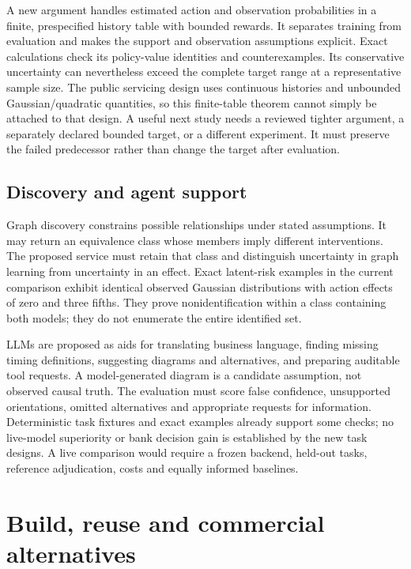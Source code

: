 A new argument handles estimated action and observation probabilities in
a finite, prespecified history table with bounded rewards. It separates
training from evaluation and makes the support and observation
assumptions explicit. Exact calculations check its policy-value
identities and counterexamples. Its conservative uncertainty can
nevertheless exceed the complete target range at a representative sample
size. The public servicing design uses continuous histories and
unbounded Gaussian/quadratic quantities, so this finite-table theorem
cannot simply be attached to that design. A useful next study needs a
reviewed tighter argument, a separately declared bounded target, or a
different experiment. It must preserve the failed predecessor rather
than change the target after evaluation.
\citep{sp13_servicing_successor}

\hypertarget{discovery-and-agent-support}{%
\subsection{Discovery and agent
support}\label{discovery-and-agent-support}}

Graph discovery constrains possible relationships under stated
assumptions. It may return an equivalence class whose members imply
different interventions. The proposed service must retain that class and
distinguish uncertainty in graph learning from uncertainty in an effect.
Exact latent-risk examples in the current comparison exhibit identical
observed Gaussian distributions with action effects of zero and three
fifths. They prove nonidentification within a class containing both
models; they do not enumerate the entire identified set.
\citep{exec13_latent_examples}

LLMs are proposed as aids for translating business language, finding
missing timing definitions, suggesting diagrams and alternatives, and
preparing auditable tool requests. A model-generated diagram is a
candidate assumption, not observed causal truth. The evaluation must
score false confidence, unsupported orientations, omitted alternatives
and appropriate requests for information. Deterministic task fixtures
and exact examples already support some checks; no live-model
superiority or bank decision gain is established by the new task
designs. A live comparison would require a frozen backend, held-out
tasks, reference adjudication, costs and equally informed baselines.
\citep{sp13_public}

\hypertarget{build-reuse-and-commercial-alternatives}{%
\section{Build, reuse and commercial
alternatives}\label{build-reuse-and-commercial-alternatives}}


